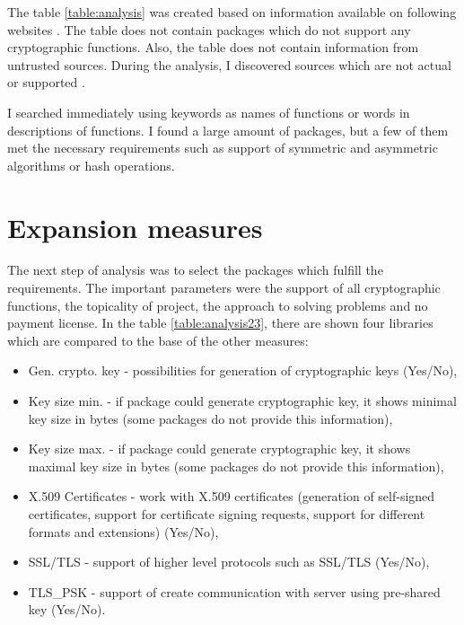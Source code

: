 \documentclass[
  digital, %
  notable,   %
  lof,     %
  lot,     %
]{fithesis3}
\begin{document}
The table \ref{table:analysis} was created based on information available on 
following websites \cite{security-golibrariesAndApps} \cite{cryptography-golibrariesAndApps} 
\cite{crypto-godoc} \cite{packages-thegoprogramminglanguage}. The 
table does not contain packages which do not support any cryptographic functions. Also, 
the table does not contain information from untrusted sources. During the analysis, I 
discovered sources which are not actual or supported \cite{puregolibs}. 

I searched immediately using keywords as names of functions or words in descriptions of functions. 
I found a large amount of packages, but a few of them met the necessary requirements such as 
support of symmetric and asymmetric algorithms or hash operations. 

\section{Expansion measures}

The next step of analysis was to select the packages which fulfill the requirements. The important 
parameters were the support of all cryptographic functions, the topicality of project, the 
approach to solving problems and no payment license. In the table \ref{table:analysis23}, 
there are shown four libraries which are compared to the base of the other measures:
\vskip0.1in
\begin{itemize}[leftmargin=2em,rightmargin=1em,itemsep=0.75\parskip,parsep=0em,topsep=0em,partopsep=0em]
\item Gen. crypto. key - possibilities for generation of cryptographic keys (Yes/No),
\item Key size min. - if package could generate cryptographic key, it shows minimal key size in bytes (some packages do not provide this information),
\item Key size max. - if package could generate cryptographic key, it shows maximal key size in bytes (some packages do not provide this information),
\item X.509 Certificates - work with X.509 certificates (generation of self-signed certificates, support for certificate signing requests, support for different formats and extensions) (Yes/No),
\item SSL/TLS - support of higher level protocols such as SSL/TLS (Yes/No),
\item TLS\_PSK - support of create communication with server using pre-shared key (Yes/No).
\end{itemize}
\vskip0.1in
\end{document}
